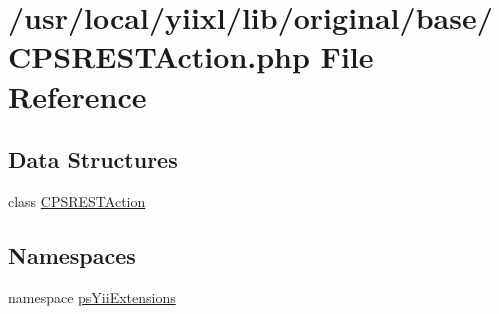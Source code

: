 \hypertarget{CPSRESTAction_8php}{
\section{/usr/local/yiixl/lib/original/base/CPSRESTAction.php File Reference}
\label{CPSRESTAction_8php}
}
\subsection*{Data Structures}
\begin{DoxyCompactItemize}
\item 
class \hyperlink{classCPSRESTAction}{CPSRESTAction}
\end{DoxyCompactItemize}
\subsection*{Namespaces}
\begin{DoxyCompactItemize}
\item 
namespace \hyperlink{namespacepsYiiExtensions}{psYiiExtensions}
\end{DoxyCompactItemize}
